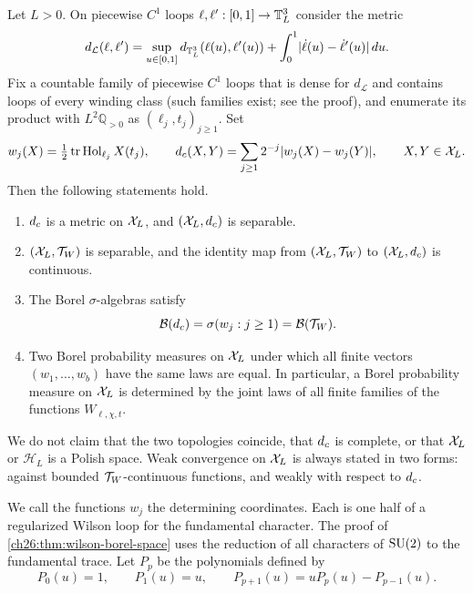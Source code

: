 \begin{theorem}\label{ch26:thm:wilson-borel-space}
Let $L>0$. On piecewise $C^1$ loops $\ell,\ell':[0,1]\to\mathbb T_L^3$ consider the metric
\[
 d_{\mathcal L}(\ell,\ell')=\sup_{u\in[0,1]}d_{\mathbb T_L^3}(\ell(u),\ell'(u))+\int_0^1\lvert \dot\ell(u)-\dot\ell'(u)\rvert\,du .
\]
Fix a countable family of piecewise $C^1$ loops that is dense for $d_{\mathcal L}$ and contains loops of every winding class (such families exist; see the proof), and enumerate its product with $L^2\mathbb Q_{>0}$ as $(\ell_j,t_j)_{j\ge1}$. Set
\[
 w_j(X)=\tfrac12\operatorname{tr}\operatorname{Hol}_{\ell_j}X(t_j),\qquad d_c(X,Y)=\sum_{j\ge1}2^{-j}\lvert w_j(X)-w_j(Y)\rvert,\qquad X,Y\in\mathcal X_L .
\]
Then the following statements hold.
\begin{enumerate}
\item $d_c$ is a metric on $\mathcal X_L$, and $(\mathcal X_L,d_c)$ is separable.
\item $(\mathcal X_L,\mathcal T_W)$ is separable, and the identity map from $(\mathcal X_L,\mathcal T_W)$ to $(\mathcal X_L,d_c)$ is continuous.
\item The Borel $\sigma$-algebras satisfy
\[
 \mathcal B(d_c)=\sigma(w_j:j\ge1)=\mathcal B(\mathcal T_W).
\]
\item Two Borel probability measures on $\mathcal X_L$ under which all finite vectors $(w_1,\dots,w_b)$ have the same laws are equal. In particular, a Borel probability measure on $\mathcal X_L$ is determined by the joint laws of all finite families of the functions $W_{\ell,\chi,t}$.
\end{enumerate}
\end{theorem}

\begin{remark}\label{ch26:rem:no-polish}
We do not claim that the two topologies coincide, that $d_c$ is complete, or that $\mathcal X_L$ or $\mathcal H_L$ is a Polish space. Weak convergence on $\mathcal X_L$ is always stated in two forms: against bounded $\mathcal T_W$-continuous functions, and weakly with respect to $d_c$.
\end{remark}

We call the functions $w_j$ the determining coordinates. Each is one half of a regularized Wilson loop for the fundamental character. The proof of \cref{ch26:thm:wilson-borel-space} uses the reduction of all characters of $\mathrm{SU}(2)$ to the fundamental trace. Let $P_p$ be the polynomials defined by
\[
 P_0(u)=1,\qquad P_1(u)=u,\qquad P_{p+1}(u)=uP_p(u)-P_{p-1}(u).
\]

